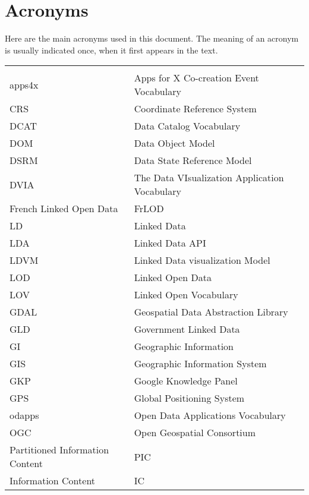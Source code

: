 

\chapter*{Acronyms}

Here are the main acronyms used in this document. The meaning of an acronym is usually indicated once, when it first appears in the text. 


\begin{longtable}{lp{11cm}}
  &\\
  apps4x	 & Apps for X Co-creation Event Vocabulary\\
  CRS &  Coordinate Reference System\\
  
  DCAT & Data Catalog Vocabulary\\
  DOM  & Data Object Model \\
  DSRM & Data State Reference Model \\
  DVIA & The Data VIsualization Application Vocabulary\\
  
  French Linked Open Data & FrLOD \\
  LD  &  Linked Data\\
  LDA &  Linked Data API \\
  LDVM & Linked Data visualization Model \\
  LOD &  Linked Open Data\\ 
  
  
  LOV &  Linked Open Vocabulary\\
  
  GDAL& Geospatial Data Abstraction Library \\
  GLD &  Government Linked Data\\
  GI  &  Geographic Information\\
  GIS &  Geographic Information System\\
  GKP &  Google Knowledge Panel \\
  GPS &  Global Positioning System \\
  
  odapps	 & Open Data Applications Vocabulary\\
  OGC &  Open Geospatial Consortium\\
  
  
  Partitioned Information Content & PIC \\
  Information Content & IC \\
  

\end{longtable}

